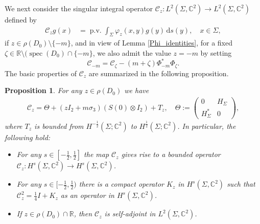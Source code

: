 \documentclass[11pt,a4paper,reqno,oneside]{amsproc}
\DeclareMathOperator{\spec}{spec}
\DeclareMathOperator{\pv}{p.v.}
\def \rr {{\mathbb R}}
\def \cc {{\mathbb C}}
\numberwithin{equation}{section}
\def \cc {{\mathbb{C}}}
\newtheorem{proposition}[definition]{Proposition}
\begin{document}
 We next consider the singular integral operator $\mathscr{C}_{z}: L^2(\Sigma,\cc^2)\longrightarrow L^2(\Sigma,\cc^2)$ defined by 
\begin{align}\label{SIO}
  \mathscr{C}_{z}g(x) &= \pv \int_{\Sigma} \varphi_{z}(x,y)g(y)\,\mathrm{d}s(y),\quad x\in\Sigma,
\end{align}
if $z\in\rho(D_0)\setminus\{-m\}$, and in view of Lemma \ref{Phi_identities}, for a fixed  $\zeta\in\rr\setminus(\spec (D_0)\cap \{-m\}$,  we also admit the value $z=-m$ by setting
 \begin{equation}\label{C_-m}
 \mathscr C_{-m}=\mathscr C_{\zeta}- (m+\zeta)\Phi^\ast_{-m}\Phi_{\zeta}.
 \end{equation}
The basic properties of $\mathscr{C}_{z}$  are summarized in the following proposition. 
\begin{proposition}\label{Basic_C_z} For any  $z\in\rho(D_0)$ we have 
\begin{align}\label{IdenC}
\mathscr C_z= \Theta + (z I_2+m\sigma_3)(S(0) \otimes I_2)  + T_z, \quad 
\Theta:=   \begin{pmatrix} 
	       0& H_\Sigma\\ 
	H^*_\Sigma & 0 \, 
	   \end{pmatrix},
\end{align}
where $T_z$ is bounded from $H^{-\frac{1}{2}}(\Sigma;\cc^2)$ to $H^{\frac{1}{2}}(\Sigma;\cc^2)$. In particular,  the following hold:
\begin{itemize}
			\item[$\textup{(i)}$] For any $s\in[-\frac{1}{2},\frac{1}{2}]$ the map $\mathscr{C}_{z}$ gives rise to a bounded operator  $\mathscr{C}_{z}: H^s(\Sigma,\cc^2)\longrightarrow H^s(\Sigma,\cc^2)$. 
            \item[$\textup{(ii)}$] For any $s\in[-\frac{1}{2},\frac{1}{2})$ there is a compact operator $K_z$ in $H^s(\Sigma,\cc^2)$ such that $\mathscr{C}_z^2= \frac{1}{4}I + K_z$ as an operator in $H^s(\Sigma,\cc^2)$. 
            \item[$\textup{(iii)}$] If $z\in\rho(D_0)\cap\rr$, then $\mathscr{C}_{z}$ is self-adjoint in $L^2(\Sigma,\cc^2)$.
		\end{itemize}
\end{proposition}
\end{document}
